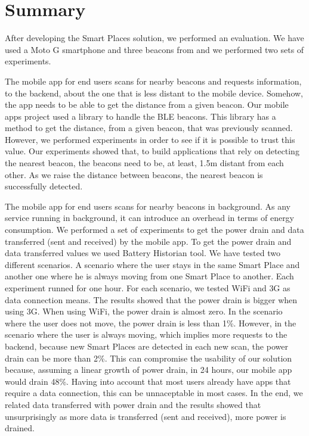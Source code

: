 \section{Summary}
\label{sec:evaluation_summary}
After developing the Smart Places solution, we performed an evaluation.
We have used a  Moto G smartphone and three beacons from  and we performed two sets of experiments.

The mobile app for end users scans for nearby beacons and requests information, to the backend, about the one that is less distant to the mobile device.
Somehow, the app needs to be able to get the distance from a given beacon.
Our mobile apps project used a library to handle the \gls{BLE} beacons. This library has a method to get the distance, from a given beacon, that was previously scanned.
However, we performed experiments in order to see if it is possible to trust this value.
Our experiments showed that, to build applications that rely on detecting the nearest beacon, the beacons need to be, at least, 1.5m distant from each other.
As we raise the distance between beacons, the nearest beacon is successfully detected.

The mobile app for end users scans for nearby beacons in background.
As any service running in background, it can introduce an overhead in terms of energy consumption.
We performed a set of experiments to get the power drain and data transferred (sent and received) by the mobile app.
To get the power drain and data transferred values we used Battery Historian tool.
We have tested two different scenarios. A scenario where the user stays in the same Smart Place and another one where he is always moving from one Smart Place to another.
Each experiment runned for one hour.
For each scenario, we tested \gls{WiFi} and \gls{3G} as data connection means.
The results showed that the power drain is bigger when using \gls{3G}. When using \gls{WiFi}, the power drain is almost zero.
In the scenario where the user does not move, the power drain is less than 1\%.
However, in the scenario where the user is always moving, which implies more requests to the backend, because new Smart Places are detected in each new scan, the power drain can be more than 2\%.
This can compromise the usability of our solution because, assuming a linear growth of power drain, in 24 hours, our mobile app would drain 48\%.
Having into account that most users already have apps that require a data connection, this can be unnaceptable in most cases.
In the end, we related data transferred with power drain and the results showed that unsurprisingly as more data is transferred (sent and received), more power is drained.
